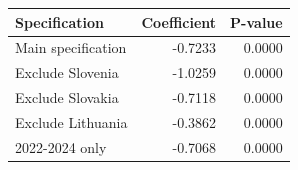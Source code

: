 \begin{tabular}{lrr}
\hline
Specification & Coefficient & P-value \\
\hline
Main specification & -0.7233 & 0.0000 \\
Exclude Slovenia & -1.0259 & 0.0000 \\
Exclude Slovakia & -0.7118 & 0.0000 \\
Exclude Lithuania & -0.3862 & 0.0000 \\
2022-2024 only & -0.7068 & 0.0000 \\
\hline
\end{tabular}
